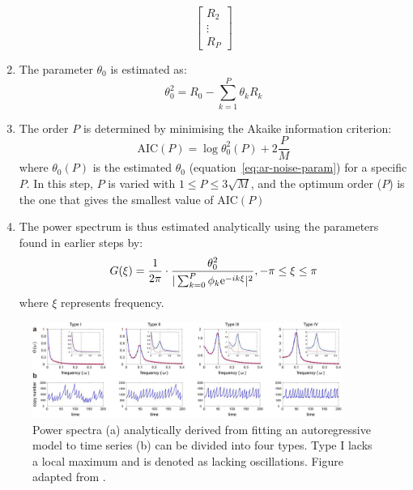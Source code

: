 \begin{enumerate}
\begin{equation}
\begin{bmatrix}
            R_{2} \\
            \vdots \\
            R_{P}
          \end{bmatrix}
        \end{equation}
  \item The parameter $\theta_{0}$ is estimated as:
        \begin{equation}
          \label{eq:ar-noise-param}
          \theta_{0}^{2} = R_{0} - \sum_{k=1}^{P}\theta_{k}R_{k}
        \end{equation}
  \item The order $P$ is determined by minimising the Akaike information criterion:
        \begin{equation}
          \label{eq:ar-aic}
          \mathrm{AIC}(P) = \log \theta_{0}^{2}(P) + 2 \frac{P}{M}
        \end{equation}
        where $\theta_{0}(P)$ is the estimated $\theta_{0}$ (equation~\ref{eq:ar-noise-param}) for a specific $P$.
        In this step, $P$ is varied with $1 \leq P \leq 3 \sqrt{M}$, and the optimum order ($P$) is the one that gives the smallest value of $\mathrm{AIC}(P)$
   \item The power spectrum is thus estimated analytically using the parameters found in earlier steps by:
        \begin{equation}
          \label{eq:ar-power-spectrum}
          G(\xi) = \frac{1}{2 \pi} \cdot \frac{\theta_{0}^{2}}{|\sum_{k=0}^{P}\phi_{k}\mathrm{e}^{-ik\xi}|^{2}}, -\pi \leq \xi \leq \pi
        \end{equation}
        where $\xi$ represents frequency.
\end{enumerate}

\begin{figure}
  \centering
  \includegraphics[width=0.9\textwidth]{jiaFrequencyDomainAnalysis2020_2ab_adapted}
  \caption[
    Power spectra analytically derived from fitting an autoregressive model to time series can be divided into four types
  ]{
    Power spectra (a) analytically derived from fitting an autoregressive model to time series (b) can be divided into four types.
    Type I lacks a local maximum and is denoted as lacking oscillations.
    Figure adapted from \textcite{jiaFrequencyDomainAnalysis2020}.
  }
  \label{fig:analysis-ar-classification}
\end{figure}

